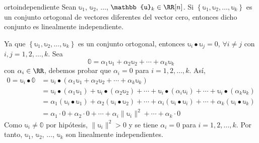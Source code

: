 \begin{theorem}{}{ortoindependiente}
    Sean $\mathbb{u}_1$, $\mathbb{u}_2$, $\dots$, $\mathbb{u}_k \in \RR[n]$. Si $\left\{ \mathbb{u}_1, \mathbb{u}_2, \dots, \mathbb{u}_k \right\}$ es un conjunto ortogonal de vectores diferentes del vector cero, entonces dicho conjunto es linealmente independiente.

    \tcblower
    \demostracion Ya que $\left\{ \mathbb{u}_1, \mathbb{u}_2, \dots, \mathbb{u}_k \right\}$ es un conjunto ortogonal, entonces $\mathbb{u}_i \bullet \mathbb{u}_j = 0$, $\forall i \neq j$ con $i, j = 1, 2, \dots, k$. Sea
    $$\mathbb{0} = \alpha_1\mathbb{u}_1 + \alpha_2\mathbb{u}_2 + \cdots + \alpha_k\mathbb{u}_k$$
    con $\alpha_i \in \RR$, debemos probar que $\alpha_i = 0$ para $i = 1, 2, \dots, k$. Así,
    \begin{align*}
        0 = \mathbb{u}_i \bullet \mathbb{0} & = \mathbb{u}_i \bullet \left( \alpha_1\mathbb{u}_1 + \alpha_2\mathbb{u}_2 + \cdots + \alpha_k\mathbb{u}_k \right) \\
        & = \mathbb{u}_i \bullet ( \alpha_1\mathbb{u}_1) + \mathbb{u}_i \bullet (\alpha_2\mathbb{u}_2) + \cdots + \mathbb{u}_i \bullet (\alpha_i\mathbb{u}_i) + \cdots + \mathbb{u}_i \bullet (\alpha_k\mathbb{u}_k) \\
        & = \alpha_1 ( \mathbb{u}_i \bullet \mathbb{u}_1) + \alpha_2 (\mathbb{u}_i \bullet \mathbb{u}_2) + \cdots + \alpha_i (\mathbb{u}_i \bullet \mathbb{u}_i) + \cdots + \alpha_k (\mathbb{u}_i \bullet \mathbb{u}_k) \\
        & = \alpha_1 \cdot 0 + \alpha_2 \cdot 0 + \cdots + \alpha_i \| \mathbb{u}_i \|^2 + \cdots + \alpha_k \cdot 0
    \end{align*}
    Como $\mathbb{u}_i \neq \mathbb{0}$ por hipótesis, $\| \mathbb{u}_i \|^2 > 0$ y se tiene $\alpha_i = 0$ para $i = 1, 2, \dots, k$. Por tanto, $\mathbb{u}_1$, $\mathbb{u}_2$, $\dots$, $\mathbb{u}_k$ son linealmente independientes.
\end{theorem}

